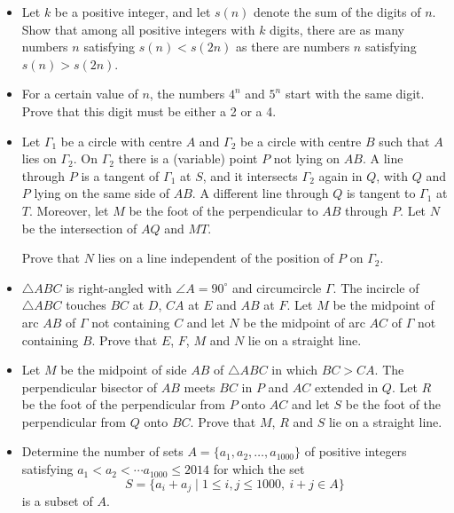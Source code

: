 \documentclass[12pt]{article}
\begin{document}
\begin{itemize}
\item %
Let $k$ be a positive integer, and let $s(n)$ denote the sum of the digits of $n$. Show that among all positive integers with $k$ digits, there are as many numbers $n$ satisfying $s(n)<s(2n)$ as there are numbers $n$ satisfying $s(n)>s(2n)$.


\item %
For a certain value of $n$, the numbers $4^n$ and $5^n$ start with the same digit. Prove that this digit must be either a 2 or a 4.


\item %
Let $\Gamma_1$ be a circle with centre $A$ and $\Gamma_2$ be a circle with centre $B$ such that $A$ lies on $\Gamma_2$. On $\Gamma_2$ there is a (variable) point $P$ not lying on $AB$. A line through $P$ is a tangent of $\Gamma_1$ at $S$, and it intersects $\Gamma_2$ again in $Q$, with $Q$ and $P$ lying on the same side of $AB$. A different line through $Q$ is tangent to $\Gamma_1$ at $T$. Moreover, let $M$ be the foot of the perpendicular to $AB$ through $P$. Let $N$ be the intersection of $AQ$ and $MT$.
	
Prove that $N$ lies on a line independent of the position of $P$ on $\Gamma_2$.


\item %
$\triangle ABC$ is right-angled with $\angle A=90^\circ$ and circumcircle $\Gamma$. The incircle of $\triangle ABC$ touches $BC$ at $D$, $CA$ at $E$ and $AB$ at $F$. Let $M$ be the midpoint of arc $AB$ of $\Gamma$ not containing $C$ and let $N$ be the midpoint of arc $AC$ of $\Gamma$ not containing $B$. Prove that $E$, $F$, $M$ and $N$ lie on a straight line.


\item %
Let $M$ be the midpoint of side $AB$ of $\triangle ABC$ in which $BC>CA$. The perpendicular bisector of $AB$ meets $BC$ in $P$ and $AC$ extended in $Q$. Let $R$ be the foot of the perpendicular from $P$ onto $AC$ and let $S$ be the foot of the perpendicular from $Q$ onto $BC$. Prove that $M$, $R$ and $S$ lie on a straight line.


\item %
Determine the number of sets $A=\{a_1,a_2,\ldots, a_{1000}\}$ of positive integers satisfying $a_1<a_2<\cdots a_{1000}\le 2014$ for which the set
	\[ S = \{a_i+a_j\mid 1\le i,j\le 1000,\ i+j\in A\} \]
is a subset of $A$.


\end{itemize}
\end{document}
